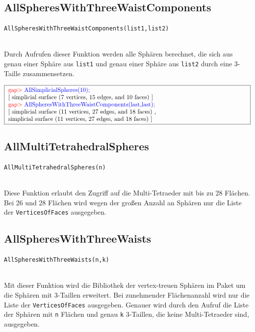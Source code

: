 \documentclass[12pt,titlepage,twoside,cleardoublepage]{article}
\theoremstyle{nummermitklammern}
\numberwithin{equation}{section}
\begin{document}
\subsection{AllSpheresWithThreeWaistComponents}
\begin{large}
\texttt{AllSpheresWithThreeWaistComponents(list1,list2)}
\end{large}\\
Durch Aufrufen dieser Funktion werden alle Sphären berechnet, die sich aus genau einer Sphäre aus \texttt{list1} und genau einer Sphäre aus \texttt{list2} durch eine 3-Taille zusammensetzen.
\begin{center}
$\fbox{
\parbox{14cm}{
\textcolor{red}{gap$>$} \textcolor{blue}{AllSimplicialSpheres(10);}\newline
[ simplicial surface (7 vertices, 15 edges, and 10 faces) ]\newline
\textcolor{red}{gap$>$} \textcolor{blue}{AllSpheresWithThreeWaistComponents(last,last);}\newline
[ simplicial surface (11 vertices, 27 edges, and 18 faces)
    ,\newline
  simplicial surface (11 vertices, 27 edges, and 18 faces)
 ]
}
}$
\end{center}
\subsection{AllMultiTetrahedralSpheres}
\begin{large}
\texttt{AllMultiTetrahedralSpheres(n)}
\end{large}\\
Diese Funktion erlaubt den Zugriff auf die Multi-Tetraeder mit bis zu 28 Flächen. Bei 26 und 28 Flächen wird wegen der großen Anzahl an Sphären nur die Liste der \texttt{VerticesOfFaces} ausgegeben.
\subsection{AllSpheresWithThreeWaists}
\begin{large}
\texttt{AllSpheresWithThreeWaists(n,k)}
\end{large}\\
Mit dieser Funktion wird die Bibliothek der vertex-treuen Sphären im Paket um die Sphären mit 3-Taillen erweitert.  Bei zunehmender Flächenanzahl wird nur die Liste der \texttt{VerticesOfFaces} ausgegeben. Genauer wird durch den Aufruf die Liste der Sphären mit \texttt{n} Flächen und genau \texttt{k} 3-Taillen, die keine Multi-Tetraeder sind, ausgegeben.
\end{document}
